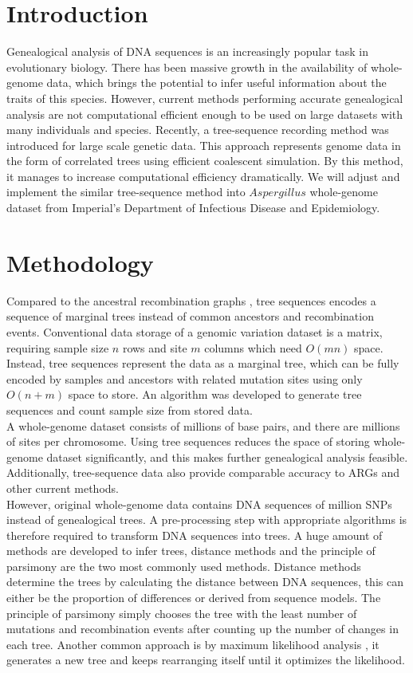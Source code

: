 \documentclass[11pt]{article}
\begin{document}
\section{Introduction}
Genealogical analysis of DNA sequences is an increasingly popular task in evolutionary biology. There has been massive growth in the availability of whole-genome data, which brings the potential to infer useful information about the traits of this species. However, current methods performing accurate genealogical analysis are not computational efficient enough to be used on large datasets with many individuals and species. Recently, a tree-sequence recording method \citep{kelleher2016efficient} was introduced for large scale genetic data. This approach represents genome data in the form of correlated trees using efficient coalescent simulation. By this method, it manages to increase computational efficiency dramatically. We will adjust and implement the similar tree-sequence method into $Aspergillus$ whole-genome dataset from Imperial’s Department of Infectious Disease and Epidemiology.


\section{Methodology}
Compared to the ancestral recombination graphs \citep{griffiths1996ancestral}, tree sequences \citep{kelleher2019inferring} encodes a sequence of marginal trees instead of common ancestors and recombination events. Conventional data storage of a genomic variation dataset is a matrix, requiring sample size $n$ rows and site $m$ columns which need $O(mn)$ space. Instead, tree sequences represent the data as a marginal tree, which can be fully encoded by samples and ancestors with related mutation sites using only $O(n+m)$ space to store. An algorithm was developed \citep{kelleher2016efficient} to generate tree sequences and count sample size from stored data. \\
A whole-genome dataset consists of millions of base pairs, and there are millions of sites per chromosome. Using tree sequences reduces the space of storing whole-genome dataset significantly, and this makes further genealogical analysis feasible. Additionally, tree-sequence data also provide comparable accuracy to ARGs and other current methods.\\
However, original whole-genome data contains DNA sequences of million SNPs instead of genealogical trees. A pre-processing step with appropriate algorithms is therefore required to transform DNA sequences into trees. A huge amount of methods are developed to infer trees, distance methods and the principle of parsimony are the two most commonly used methods. Distance methods determine the trees by calculating the distance between DNA sequences, this can either be the proportion of differences or derived from sequence models. The principle of parsimony simply chooses the tree with the least number of mutations and recombination events after counting up the number of changes in each tree. Another common approach is by maximum likelihood analysis \citep{yang2007paml}, it generates a new tree and keeps rearranging itself until it optimizes the likelihood. 
\end{document}
